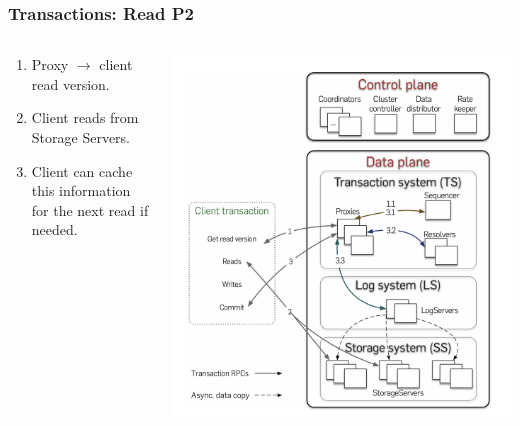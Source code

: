 \begin{frame}
    \frametitle{Transactions: Read P2}
    \begin{columns}
        \begin{column}{0.5\textwidth}
            \begin{enumerate}
    \item Proxy $\rightarrow$ client read version.
    \item Client reads from Storage Servers.
    \item Client can cache this information for the next read if needed.
            \end{enumerate}
        \end{column}
        \begin{column}{0.5\textwidth}
            \centering
            \includegraphics[width=\textwidth]{img/2-Architecture/Architecture and transaction processing.png}
        \end{column}
    \end{columns}
\end{frame}


